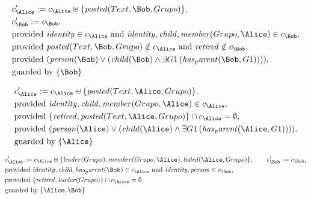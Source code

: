 \begin{align*}
&
c'_
{
\Alice
}
 := 
c_
{
\Alice
}
 \uplus 
\{
\mathit{
posted
}
(
Text
,
\Bob
,
Grupo
)
\}
,\\
&
c'_
{
\Bob
}
 := 
c_
{
\Bob
}
,\\
&
\text{provided } 
\mathit{
identity
}
 \in c_
{
\Alice
}
 \text{ and } 
\mathit{
identity
}
,
\mathit{
child
}
,
\mathit{
member
}
(
Grupo
,
\Alice
)
 \in c_
{
\Bob
}
,\\
&
\text{provided } 
\mathit{
posted
}
(
Text
,
\Bob
,
Grupo
)
 \notin c_
{
\Alice
}
 \text{ and } 
\mathit{
retired
}
 \notin c_
{
\Bob
}
,\\
&
\text{provided } 
(
\mathit{
person
}
(
\Bob
)
\lor
(
\mathit{
child
}
(
\Bob
)
\land
\exists 
G1
\,(
\mathit{
has_parent
}
(
\Bob
,
G1
)
)
)
)
,\\
&
\text{guarded by } \{
\Bob
\}
\end{align*}

\begin{align*}
&
c'_
{
\Alice
}
 := 
c_
{
\Alice
}
 \uplus 
\{
\mathit{
posted
}
(
Text
,
\Alice
,
Grupo
)
\}
,\\
&
\text{provided } 
\mathit{
identity
}
,
\mathit{
child
}
,
\mathit{
member
}
(
Grupo
,
\Alice
)
 \in c_
{
\Alice
}
,\\
&
\text{provided } 
\{
\mathit{
retired
}
,
\mathit{
posted
}
(
Text
,
\Alice
,
Grupo
)
\}
 \cap c_
{
\Alice
}
 = \emptyset
,\\
&
\text{provided } 
(
\mathit{
person
}
(
\Alice
)
\lor
(
\mathit{
child
}
(
\Alice
)
\land
\exists 
G1
\,(
\mathit{
has_parent
}
(
\Alice
,
G1
)
)
)
)
,\\
&
\text{guarded by } \{
\Alice
\}
\end{align*}

\begin{align*}
&
c'_
{
\Alice
}
 := 
c_
{
\Alice
}
 \uplus 
\{
\mathit{
leader
}
(
Grupo
)
,
\mathit{
member
}
(
Grupo
,
\Alice
)
,
\mathit{
listed
}
(
\Alice
,
Grupo
)
\}
, \qquad 
c'_
{
\Bob
}
 := 
c_
{
\Bob
}
,\\
&
\text{provided } 
\mathit{
identity
}
,
\mathit{
child
}
,
\mathit{
has_parent
}
(
\Bob
)
 \in c_
{
\Alice
}
 \text{ and } 
\mathit{
identity
}
,
\mathit{
person
}
 \in c_
{
\Bob
}
,\\
&
\text{provided } 
\{
\mathit{
retired
}
,
\mathit{
leader
}
(
Grupo
)
\}
 \cap c_
{
\Alice
}
 = \emptyset
,\\
&
\text{guarded by } \{
\Alice
,
\Bob
\}
\end{align*}

